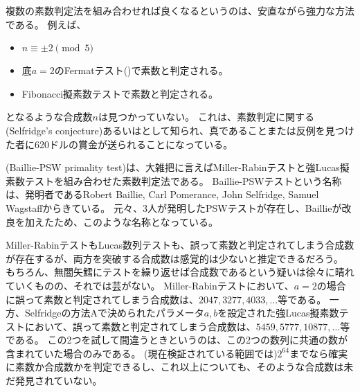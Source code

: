 複数の素数判定法を組み合わせれば良くなるというのは、安直ながら強力な方法である。
例えば、
\begin{itemize}
 \item $n \equiv \pm 2 \pmod{5}$
 \item 底$a=2$のFermatテスト()で素数と判定される。
 \item Fibonacci擬素数テストで素数と判定される。
\end{itemize}
となるような合成数$n$は見つかっていない。
これは、素数判定に関する(Selfridge's conjecture)あるいはとして知られ、真であることまたは反例を見つけた者に620ドルの賞金が送られることになっている\cite{A_Computational_Perspective}。

(Baillie-PSW primality test)は、大雑把に言えばMiller-Rabinテストと強Lucas擬素数テストを組み合わせた素数判定法である。
Baillie-PSWテストという名称は、発明者であるRobert Baillie, Carl Pomerance, John Selfridge, Samuel Wagstaffからきている。
元々、3人が発明したPSWテストが存在し、Baillieが改良を加えたため、このような名称となっている。

Miller-RabinテストもLucas数列テストも、誤って素数と判定されてしまう合成数が存在するが、両方を突破する合成数は感覚的は少ないと推定できるだろう。
もちろん、無闇矢鱈にテストを繰り返せば合成数であるという疑いは徐々に晴れていくものの、それでは芸がない。
Miller-Rabinテストにおいて、$a=2$の場合に誤って素数と判定されてしまう合成数は、$2047, 3277, 4033,\ldots$等である。
一方、Selfridgeの方法Aで決められたパラメータ$a,b$を設定された強Lucas擬素数テストにおいて、誤って素数と判定されてしまう合成数は、$5459, 5777, 10877,\ldots$等である。
この2つを試して間違うときというのは、この2つの数列に共通の数が含まれていた場合のみである。
(現在検証されている範囲では)$2^64$までなら確実に素数か合成数かを判定できるし、これ以上についても、そのような合成数は未だ発見されていない。


